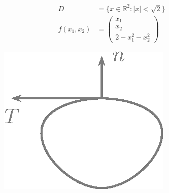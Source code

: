 \documentclass[a4paper,10pt]{scrbook}
\begin{document}

\begin{example}
  \begin{align*}
    D &= \{ x \in \mathbb{R}^2 : |x| < \sqrt{2} \} \\
    f(x_1,x_2) &= \begin{pmatrix} x_1 \\ x_2 \\ 2 - x_1^2 - x_2^2 \end{pmatrix}
  \end{align*}

  \begin{figure}[H]
    \centering
    \includegraphics[scale=0.2]{images/ana3-tmp-58}
  \end{figure}


\end{example}
\end{document}
